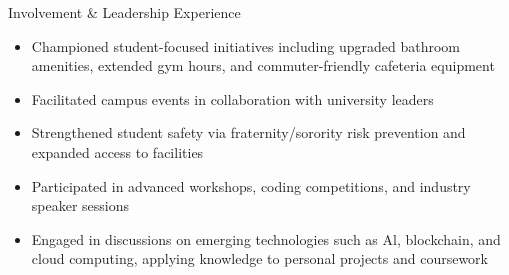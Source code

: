 \documentclass{resume}
\begin{document}
\begin{experienceSection}{Involvement \& Leadership Experience}
    \projectItem[
        title={Student Senate Committee for Student Affairs},
    ]
    \begin{itemize}[topsep=0pt, itemsep=-6pt, leftmargin=2em, rightmargin=0.8em, before=\raggedright, after=\normalfont]
        \vspace{-0.5em}
        \item Championed student-focused initiatives including upgraded bathroom amenities, extended gym hours, and commuter-friendly cafeteria equipment
        \item Facilitated campus events in collaboration with university leaders
        \item Strengthened student safety via fraternity/sorority risk prevention and expanded access to facilities
    \end{itemize}
    \vspace{0em}
    \projectItem[
        title={Association for Computing Machinery},
    ]
    \begin{itemize}[topsep=0pt, itemsep=-6pt, leftmargin=2em, rightmargin=0.8em, before=\raggedright, after=\normalfont]
        \vspace{-0.5em}
        \item Participated in advanced workshops, coding competitions, and industry speaker sessions
        \item Engaged in discussions on emerging technologies such as Al, blockchain, and cloud computing, applying knowledge to personal projects and coursework
    \end{itemize}
    \vspace{0em}
    


\end{experienceSection}
\end{document}
